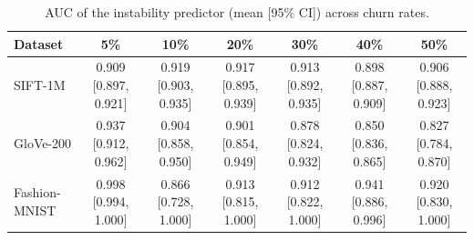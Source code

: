 \documentclass{ieeeaccess}
\begin{document}
\begin{table}[t]
\centering
\caption{AUC of the instability predictor (mean [95\% CI]) across churn rates.}
\label{tab:auc}
\begin{tabular}{lcccccc}
\toprule
Dataset & 5\% & 10\% & 20\% & 30\% & 40\% & 50\% \\
\midrule
SIFT-1M & 0.909 [0.897, 0.921] & 0.919 [0.903, 0.935] & 0.917 [0.895, 0.939] & 0.913 [0.892, 0.935] & 0.898 [0.887, 0.909] & 0.906 [0.888, 0.923] \\
GloVe-200 & 0.937 [0.912, 0.962] & 0.904 [0.858, 0.950] & 0.901 [0.854, 0.949] & 0.878 [0.824, 0.932] & 0.850 [0.836, 0.865] & 0.827 [0.784, 0.870] \\
Fashion-MNIST & 0.998 [0.994, 1.000] & 0.866 [0.728, 1.000] & 0.913 [0.815, 1.000] & 0.912 [0.822, 1.000] & 0.941 [0.886, 0.996] & 0.920 [0.830, 1.000] \\
\bottomrule
\end{tabular}
\end{table}
\end{document}
